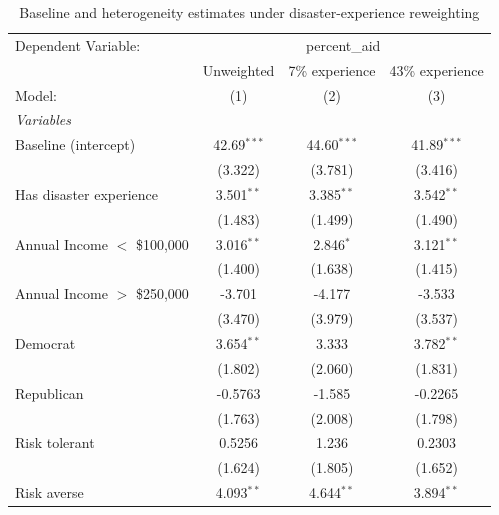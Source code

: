 
\begin{table}[htbp]
   \caption{\label{sitab:de_reweight} Baseline and heterogeneity estimates under disaster-experience reweighting}
   \centering
   \begin{tabular}{lccc}
      \tabularnewline \midrule \midrule
      Dependent Variable: & \multicolumn{3}{c}{percent\_aid}\\
                                   & Unweighted     & 7\% experience  & 43\% experience \\    
      Model:                       & (1)            & (2)             & (3)\\  
      \midrule
      \emph{Variables}\\
      Baseline (intercept)         & 42.69$^{***}$  & 44.60$^{***}$   & 41.89$^{***}$\\   
                                   & (3.322)        & (3.781)         & (3.416)\\   
      Has disaster experience      & 3.501$^{**}$   & 3.385$^{**}$    & 3.542$^{**}$\\   
                                   & (1.483)        & (1.499)         & (1.490)\\   
      Annual Income $<$ \$100,000  & 3.016$^{**}$   & 2.846$^{*}$     & 3.121$^{**}$\\   
                                   & (1.400)        & (1.638)         & (1.415)\\   
      Annual Income $>$ \$250,000  & -3.701         & -4.177          & -3.533\\   
                                   & (3.470)        & (3.979)         & (3.537)\\   
      Democrat                     & 3.654$^{**}$   & 3.333           & 3.782$^{**}$\\   
                                   & (1.802)        & (2.060)         & (1.831)\\   
      Republican                   & -0.5763        & -1.585          & -0.2265\\   
                                   & (1.763)        & (2.008)         & (1.798)\\   
      Risk tolerant                & 0.5256         & 1.236           & 0.2303\\   
                                   & (1.624)        & (1.805)         & (1.652)\\   
      Risk averse                  & 4.093$^{**}$   & 4.644$^{**}$    & 3.894$^{**}$\\   

\end{tabular}
\end{table}
